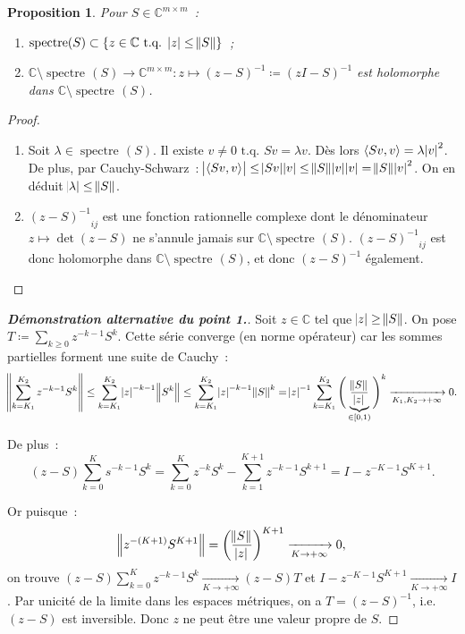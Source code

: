 \documentclass{report}
\DeclareMathOperator{\spectreOperator}{spectre\!}
\newcommand{\C}{{\mathbb C}}
\newcommand{\scpr}[2]{\left\langle#1, #2\right\rangle}
\newcommand{\tq}{\text{ t.q. }}
\newcommand{\st}{\tq}
\newcommand{\pinfty}{{+\infty}}
\newcommand{\spectre}[1]{{\spectreOperator\left(#1\right)}}
\newtheorem{prp}[thm]{Proposition}
\theoremstyle{definition}
\theoremstyle{remark}
\begin{document}
\begin{prp} Pour $S \in \C^{m \times m}$~:
\begin{enumerate}
	\item $\spectre S \subset \{z \in \C \st \abs z \leq \norm S\}$~;
	\item $\C \setminus \spectre S \to \C^{m \times m} : z \mapsto (z-S)^{-1} \coloneqq (zI - S)^{-1}$ est holomorphe dans $\C \setminus \spectre S$.
\end{enumerate}
\end{prp}

\begin{proof}~
\begin{enumerate}
	\item Soit $\lambda \in \spectre S$. Il existe $v \neq 0 \st Sv = \lambda v$. Dès lors $\scpr {Sv}v = \lambda\abs v^2$. De plus, par Cauchy-Schwarz~:
	$\abs {\scpr {Sv}v} \leq \abs {Sv}\abs v \leq \norm S\abs v\abs v = \norm S\abs v^2$. On en déduit $\abs \lambda \leq \norm S$.
	\item ${(z-S)^{-1}}_{ij}$ est une fonction rationnelle complexe dont le dénominateur $z \mapsto \det(z-S)$ ne s'annule jamais sur $\C \setminus \spectre S$.
	${(z-S)^{-1}}_{ij}$ est donc holomorphe dans $\C \setminus \spectre S$, et donc $(z-S)^{-1}$ également.
\end{enumerate}
\end{proof}

\begin{proof}[\textnormal {\textbf {Démonstration alternative du point 1.}}]
Soit $z \in \C$ tel que $\abs z \geq \norm S$. On pose $T \coloneqq \sum_{k \geq 0}z^{-k-1}S^k$. Cette série converge (en norme opérateur) car les sommes
partielles forment une suite de Cauchy~:
\[
	\norm {\sum_{k=K_1}^{K_2}z^{-k-1}S^k} \leq \sum_{k=K_1}^{K_2}\abs z^{-k-1}\norm {S^k} \leq \sum_{k=K_1}^{K_2}\abs z^{-k-1}\norm S^k
	= \abs z^{-1}\sum_{k=K_1}^{K_2}\Bigg(\underbrace {\frac {\norm S}{\abs z}}_{\in [0, 1)}\Bigg)^k \xrightarrow[K_1,K_2 \to \pinfty]{} 0.
\]

De plus~:
\[(z-S)\sum_{k=0}^Ks^{-k-1}S^k = \sum_{k=0}^Kz^{-k}S^k - \sum_{k=1}^{K+1}z^{-k-1}S^{k+1} = I - z^{-K-1}S^{K+1}.\]

Or puisque~:
\[\norm {z^{-(K+1)}S^{K+1}} = \left(\frac {\norm S}{\abs z}\right)^{K+1} \xrightarrow[K \to \pinfty]{} 0,\]
on trouve $(z-S)\sum_{k=0}^Kz^{-k-1}S^k \xrightarrow[K \to \pinfty]{} (z-S)T$ et $I-z^{-K-1}S^{K+1} \xrightarrow[K \to \pinfty]{} I$. Par unicité de la limite
dans les espaces métriques, on a $T = (z-S)^{-1}$, i.e. $(z-S)$ est inversible. Donc $z$ ne peut être une valeur propre de $S$.
\end{proof}
\end{document}
